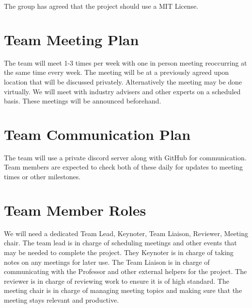 \documentclass{article}
\begin{document}
The group has agreed that the project should use a MIT License.


\section{Team Meeting Plan}


The team will meet 1-3 times per week with one in person meeting reoccurring at the same time every week. The meeting will be at a previously agreed upon location that will be discussed privately. Alternatively the meeting may be done virtually. We will meet with industry advisers and  other experts on a scheduled basis. These meetings will be announced beforehand. 








\section{Team Communication Plan}


The team will use a private discord server along with GitHub for communication. Team members are expected to check both of these daily for updates to meeting times or other milestones.  

\section{Team Member Roles}

We will need a dedicated Team Lead, Keynoter, Team Liaison, Reviewer, Meeting chair.
The team lead is in charge of scheduling meetings and other events that may be needed to complete the project. They Keynoter is in charge of taking notes on any meetings for later use. The Team Liaison is in charge of communicating with the Professor and other external helpers for the project. The reviewer is in charge of reviewing work to ensure it is of high standard. The meeting chair is in charge of managing meeting topics and making sure that the meeting stays relevant and productive. 
\end{document}
